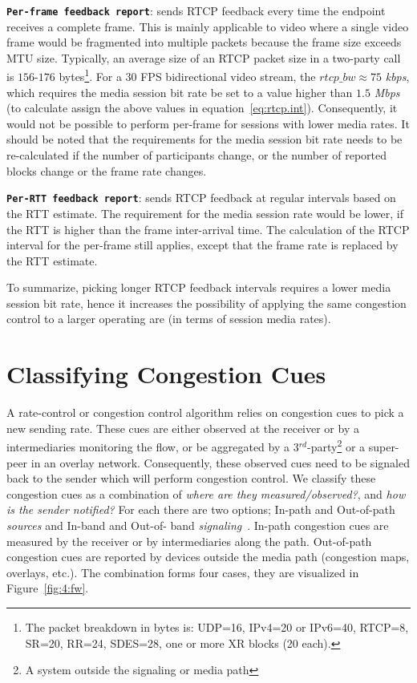 \textbf{\texttt{Per-frame feedback report}}: sends RTCP feedback every time
the endpoint receives a complete frame. This is mainly applicable to video
where a single video frame would be fragmented into multiple packets because
the frame size exceeds MTU size. Typically, an average size of an RTCP packet
size in a two-party call is $156$-$176$ bytes\footnote{The packet breakdown in
bytes is: UDP=16, IPv4=20 or IPv6=40, RTCP=8, SR=20, RR=24, SDES=28, one or
more XR blocks (20 each).}. For a 30 FPS bidirectional video stream, the
$rtcp\_bw \approx 75$ \emph{kbps}, which requires the media session bit rate
be set to a value higher than $1.5$ \emph{Mbps} (to calculate assign the above
values in equation~\ref{eq:rtcp.int}). Consequently, it would not be possible
to perform per-frame for sessions with lower media rates. It should be noted
that the requirements for the media session bit rate needs to be re-calculated
if the number of participants change, or the number of reported blocks change
or the frame rate changes.

\textbf{\texttt{Per-RTT feedback report}}: sends RTCP feedback at regular
intervals based on the RTT estimate. The requirement for the media session
rate would be lower, if the RTT is higher than the frame inter-arrival time.
The calculation of the RTCP interval for the per-frame still applies, except
that the frame rate is replaced by the RTT estimate.

To summarize, picking longer RTCP feedback intervals requires a lower media
session bit rate, hence it increases the possibility of applying the same
congestion control to a larger operating are (in terms of session media
rates).

\section{Classifying Congestion Cues}
\label{fw.fw}

A rate-control or congestion control algorithm relies on congestion cues to
pick a new sending rate. These cues are either observed at the receiver or by
a intermediaries monitoring the flow, or be aggregated by a
3$^{rd}$-party\footnote{A system outside the signaling or media path} or a
super-peer in an overlay network. Consequently, these observed cues need to be
signaled back to the sender which will perform congestion control. We classify
these congestion cues as a combination of \emph{where are they
measured/observed?}, and \emph{how is the sender notified?} For each there are
two options; In-path and Out-of-path \emph{sources} and In-band and Out-of-%
band \emph{signaling}~\cite{Singh:PhDFw}. In-path congestion cues are measured
by the receiver or by intermediaries along the path. Out-of-path congestion
cues are reported by devices outside the media path (congestion maps,
overlays, etc.). The combination forms four cases, they are visualized in
Figure~\ref{fig:4:fw}.

